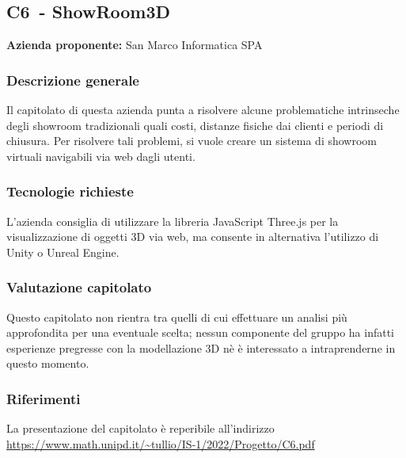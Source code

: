 
\renewcommand{\capName}{ShowRoom3D} %
\renewcommand{\capCode}{C6} %
\renewcommand{\capLink}{https://www.math.unipd.it/~tullio/IS-1/2022/Progetto/C6.pdf} %
\renewcommand{\capProposer}{SanMarco Informatica} %


\subsection{\capCode\ - \capName}
\textbf{Azienda proponente:} San Marco Informatica SPA
\subsubsection{Descrizione generale}
Il capitolato di questa azienda punta a risolvere alcune problematiche intrinseche degli showroom tradizionali quali costi, distanze fisiche dai clienti e periodi di chiusura. Per risolvere tali problemi, si vuole creare un sistema di showroom virtuali navigabili via web dagli utenti.

\subsubsection{Tecnologie richieste}
L'azienda consiglia di utilizzare la libreria JavaScript Three.js per la visualizzazione di oggetti 3D via web, ma consente in alternativa l'utilizzo di Unity o Unreal Engine.

\subsubsection{Valutazione capitolato}
Questo capitolato non rientra tra quelli di cui effettuare un analisi più approfondita per una eventuale scelta; nessun componente del gruppo ha infatti esperienze pregresse con la modellazione 3D nè è interessato a intraprenderne in questo momento.

\subsubsection{Riferimenti}
La presentazione del capitolato è reperibile all'indirizzo \url{\capLink} \hfill{}
